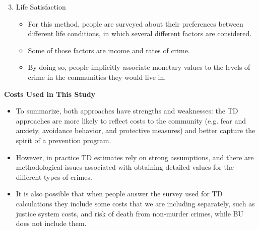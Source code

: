 \documentclass[static]{JJH-Beamer}
\begin{document}
\begin{frame}

\begin{enumerate}
\setcounter{enumi}{2}
\item Life Satisfaction
    \begin{itemize}
    \item For this method, people are surveyed about their preferences between different life conditions, in which several different factors are considered.
    \item Some of those factors are income and rates of crime.
    \item By doing so, people implicitly associate monetary values to the levels of crime in the communities they would live in.
    \end{itemize}
\end{enumerate}

\end{frame}

\begin{frame}

\begin{center}
\textbf{Costs Used in This Study}
\end{center}
\begin{itemize}
\item To summarize, both approaches have strengths and weaknesses: the TD approaches are more likely to reflect costs to the community (e.g. fear and anxiety, avoidance behavior, and protective measures) and better capture the spirit of a prevention program.
\item However, in practice TD estimates rely on strong assumptions, and there are methodological issues associated with obtaining detailed values for the different types of crimes.
\item It is also possible that when people answer the survey used for TD calculations they include some costs that we are including separately, such as justice system costs, and risk of death from non-murder crimes, while BU does not include them.
\end{itemize}

\end{frame}
\end{document}
